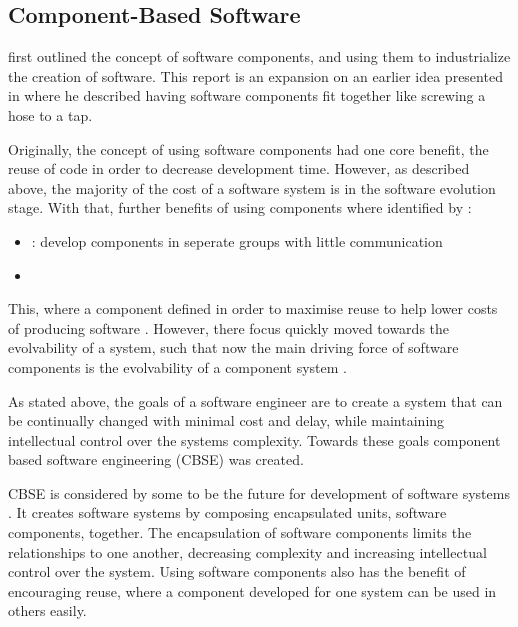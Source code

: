 \subsection{Component-Based Software}
\cite{McIlroy1969} first outlined the concept of software components, and using them to industrialize the creation of software.
This report is an expansion on an earlier idea presented in \citep{mcilroy1964pipes} 
where he described having software components fit together like screwing a hose to a tap.

Originally, the concept of using software components had one core benefit, the reuse of code in order to decrease development time.
However, as described above, the majority of the cost of a software system is in the software evolution stage.
With that, further benefits of using components where identified by \cite{Parnas1972}:
\begin{itemize}
  \item {}: develop components in seperate groups with little communication
  \item \textit{}
\end{itemize}

This, where a component  defined in order to maximise reuse to help lower costs of producing software .
However, there focus quickly moved towards the evolvability of a system, such that now the main driving force of software components is the evolvability of a component system \citep{Szyperski2000}.



As stated above, the goals of a software engineer are to create a system that can be continually changed with minimal cost and delay,
while maintaining intellectual control over the systems complexity.
Towards these goals component based software engineering (CBSE) was created.

CBSE is considered by some to be the future for development of software systems \citep{Szyperski2002}.
It creates software systems by composing encapsulated units, software components, together.
The encapsulation of software components limits the relationships to one another, decreasing complexity and increasing intellectual control over the system.
Using software components also has the benefit of encouraging reuse, where a component developed for one system can be used in others easily.

